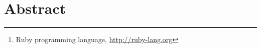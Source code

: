 \section*{Abstract}

\begin{abstract}
The main theme of this essay was the practice of compiler theories and
lisp functional programming study. The essay records my journal
about how I implemented a Scheme programming language interpreter in
Ruby\footnote{Ruby programming language, \url{http://ruby-lang.org}}.



I tried to program the project with
two times of reconstructions before the final version is done.



\end{abstract}